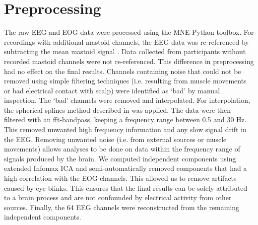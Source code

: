\section{Preprocessing}
The raw EEG and EOG data were processed using the MNE-Python toolbox. 
For recordings with additional mastoid channels, the EEG data was re-referenced by subtracting the mean mastoid signal \cite{teplan_fundamentals_2002}.
Data collected from participants without recorded mastoid channels were not re-referenced. 
This difference in preprocessing had no effect on the final results.
Channels containing noise that could not be removed using simple filtering techniques (i.e. resulting from muscle movements or bad electrical contact with scalp) were identified as `bad' by manual inspection.
The `bad' channels were removed and interpolated.
For interpolation, the spherical splines method described in \cite{perrin_spherical_1989} was applied.
The data were then filtered with an fft-bandpass, keeping a frequency range between 0.5 and 30 Hz.
This removed unwanted high frequency information and any slow signal drift in the EEG.
Removing unwanted noise (i.e. from external sources or muscle movements) allows analyses to be done on data within the frequency range of signals produced by the brain. 
We computed independent components using extended Infomax \ac{ICA} \cite{lee_independent_1999} and semi-automatically removed components that had a high correlation with the EOG channels.
This allowed us to remove artifacts caused by eye blinks.
This ensures that the final results can be solely attributed to a brain process and are not confounded by electrical activity from other sources.
Finally, the 64 EEG channels were reconstructed from the remaining independent components.